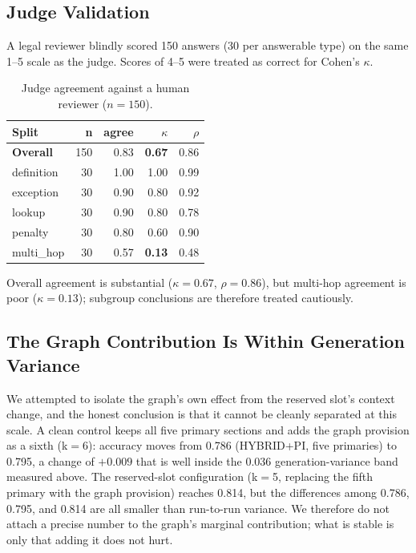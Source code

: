 \documentclass[conference]{IEEEtran}
\begin{document}
\subsection{Judge Validation}
\label{sec:judge}

A legal reviewer blindly scored 150 answers (30 per answerable type) on the same 1--5 scale as the
judge. Scores of 4--5 were treated as correct for Cohen's $\kappa$.

\begin{table}[t]
\caption{Judge agreement against a human reviewer ($n = 150$).}
\label{tab:judge}
\centering
\small
\begin{tabular}{@{}lrrrr@{}}
\hline
\textbf{Split} & \textbf{n} & \textbf{agree} & $\kappa$ & $\rho$ \\
\hline
\textbf{Overall} & 150 & 0.83 & \textbf{0.67} & 0.86 \\
definition & 30 & 1.00 & 1.00 & 0.99 \\
exception & 30 & 0.90 & 0.80 & 0.92 \\
lookup & 30 & 0.90 & 0.80 & 0.78 \\
penalty & 30 & 0.80 & 0.60 & 0.90 \\
multi\_hop & 30 & 0.57 & \textbf{0.13} & 0.48 \\
\hline
\end{tabular}
\end{table}

Overall agreement is substantial ($\kappa=0.67$, $\rho=0.86$), but multi-hop agreement is poor
($\kappa=0.13$); subgroup conclusions are therefore treated cautiously.

\subsection{The Graph Contribution Is Within Generation Variance}

We attempted to isolate the graph's own effect from the reserved slot's context change, and the
honest conclusion is that it cannot be cleanly separated at this scale. A clean control keeps all
five primary sections and adds the graph provision as a sixth (k$=$6): accuracy moves from 0.786
(HYBRID+PI, five primaries) to 0.795, a change of $+0.009$ that is well inside the $0.036$
generation-variance band measured above. The reserved-slot configuration (k$=$5, replacing the fifth
primary with the graph provision) reaches 0.814, but the differences among 0.786, 0.795, and 0.814
are all smaller than run-to-run variance. We therefore do not attach a precise number to the graph's
marginal contribution; what is stable is only that adding it does not hurt.
\end{document}
